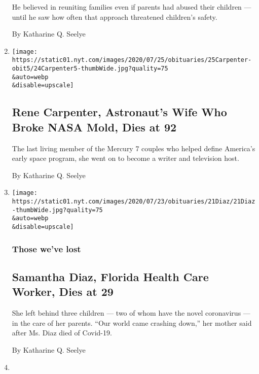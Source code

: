 \begin{enumerate}
  He believed in reuniting families even if parents had abused their
  children --- until he saw how often that approach threatened
  children's safety.

  By Katharine Q. Seelye
\item
  \href{/2020/07/24/us/rene-carpenter-dead.html}{}

  \texttt{[image: https://static01.nyt.com/images/2020/07/25/obituaries/25Carpenter-obit5/24Carpenter5-thumbWide.jpg?quality=75\\\&auto=webp\\\&disable=upscale]}

  \hypertarget{rene-carpenter-astronauts-wife-who-broke-nasa-mold-dies-at-92}{%
  \subsection{Rene Carpenter, Astronaut's Wife Who Broke NASA Mold, Dies
  at
  92}\label{rene-carpenter-astronauts-wife-who-broke-nasa-mold-dies-at-92}}

  The last living member of the Mercury 7 couples who helped define
  America's early space program, she went on to become a writer and
  television host.

  By Katharine Q. Seelye
\item
  \href{/2020/07/22/obituaries/samantha-diaz-dead-coronavirus.html}{}

  \texttt{[image: https://static01.nyt.com/images/2020/07/23/obituaries/21Diaz/21Diaz-thumbWide.jpg?quality=75\\\&auto=webp\\\&disable=upscale]}

  \hypertarget{those-weve-lost}{%
  \subsubsection{Those we've lost}\label{those-weve-lost}}

  \hypertarget{samantha-diaz-florida-health-care-worker-dies-at-29}{%
  \subsection{Samantha Diaz, Florida Health Care Worker, Dies at
  29}\label{samantha-diaz-florida-health-care-worker-dies-at-29}}

  She left behind three children --- two of whom have the novel
  coronavirus --- in the care of her parents. ``Our world came crashing
  down,'' her mother said after Ms. Diaz died of Covid-19.

  By Katharine Q. Seelye
\item
  \href{/2020/07/17/us/john-lewis-dead.html}{}


\end{enumerate}
